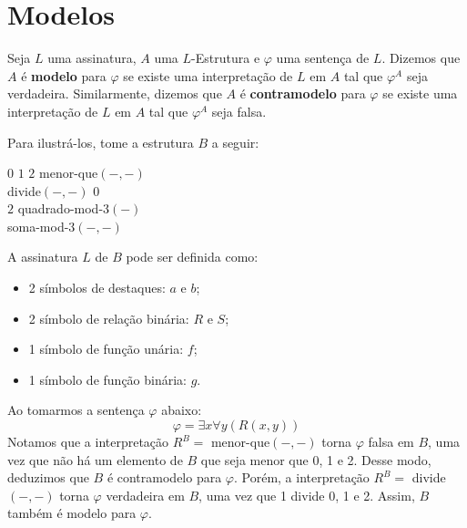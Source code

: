 \section{Modelos}

Seja $L$ uma assinatura, $A$ uma $L$-Estrutura e $\varphi$ uma sentença de $L$. Dizemos que $A$ é \textbf{modelo} para $\varphi$ se existe uma interpretação de $L$ em $A$ tal que $\varphi^A$ seja verdadeira. Similarmente, dizemos que $A$ é \textbf{contramodelo} para $\varphi$ se existe uma interpretação de $L$ em $A$ tal que $\varphi^A$ seja falsa.

Para ilustrá-los, tome a estrutura $B$ a seguir:
\begin{center}
    \begin{structure}
        {}
        {$0$ $1$ $2$}
        {menor-que$(-,-)$\\divide$(-,-)$}
        {$0$\\$2$}
        {quadrado-mod-3$(-)$\\soma-mod-3$(-,-)$}
    \end{structure}
\end{center}

A assinatura $L$ de $B$ pode ser definida como:
\begin{itemize}
    \item 2 símbolos de destaques: $a$ e $b$;
    \item 2 símbolo de relação binária: $R$ e $S$;
    \item 1 símbolo de função unária: $f$;
    \item 1 símbolo de função binária: $g$.
\end{itemize}
Ao tomarmos a sentença $\varphi$ abaixo:
\[\varphi = \exists x\forall y(R(x,y))\]
Notamos que a interpretação $R^B =$ menor-que$(-,-)$ torna $\varphi$ falsa em $B$, uma vez que não há um elemento de $B$ que seja menor que 0, 1 e 2. Desse modo, deduzimos que $B$ é contramodelo para $\varphi$. Porém, a interpretação $R^B =$ divide$(-,-)$ torna $\varphi$ verdadeira em $B$, uma vez que 1 divide 0, 1 e 2. Assim, $B$ também é modelo para $\varphi$.